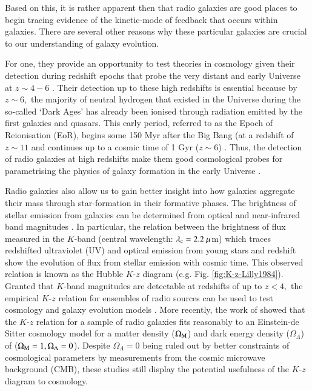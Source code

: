 Based on this, it is rather apparent then that radio galaxies are good places to begin tracing evidence of the kinetic-mode of feedback that occurs within galaxies. There are several other reasons why these particular galaxies are crucial to our understanding of galaxy evolution. 

For one, they provide an opportunity to test theories in cosmology given their detection during redshift epochs that probe the very distant and early Universe at $z\sim4-6$ \citep{LillyLongair1984,Miley1989,Lacy1994a,
Waddington1999,VanBreugel1999,Jarvis2009,Saxena2018}. Their detection up to these high redshifts is essential because by $z\sim6,$ the majority of neutral hydrogen that existed in the Universe during the so-called `Dark Ages' has already been ionised through radiation emitted by the first galaxies and quasars. This early period, referred to as the Epoch of Reionisation (EoR), begins some 150 Myr after the Big Bang (at a redshift of $z\sim11$ and continues up to a cosmic time of 1 Gyr ($z\sim6$) \citep{Zaroubi2013}. Thus, the detection of radio galaxies at high redshifts make them good cosmological probes for parametrising the physics of galaxy formation in the early Universe \citep{Fan2006,Banados2018}.  

Radio galaxies also allow us to gain better insight into how galaxies aggregate their mass through star-formation in their formative phases. The brightness of stellar emission from galaxies can be determined from optical and near-infrared band magnitudes \citep{GunnOke1975}. In particular, the relation between the brightness of flux measured in the $K$-band (central wavelength: $\lambda_{\rm c}=2.2~\mu$m) which traces redshifted ultraviolet (UV) and optical emission from young stars and redshift show the evolution of flux from stellar emission with cosmic time. This observed relation is known as the Hubble $K$-$z$ diagram (e.g. Fig. \ref{fig:K-z-Lilly1984}). Granted that $K$-band magnitudes are detectable at redshifts of up to $z<4,$ the empirical $K$-$z$ relation for ensembles of radio sources can be used to test cosmology and galaxy evolution models  \citep{LillyLongair1984,EalesRawlings1996,Eales1997}. More recently, the work of \citet{Inskip2002} showed that the $K$-$z$ relation for a sample of radio galaxies fits reasonably to an Einstein-de Sitter cosmology model for a matter density ($\Omega_{\rm M}$) and dark energy density ($\Omega_\Lambda$) of ($\Omega_{\rm M}=1, \Omega_\Lambda=0$). Despite $\Omega_\Lambda=0$ being ruled out by better constraints of cosmological parameters by \citet{Planck2016} measurements from the cosmic microwave background (CMB), these studies still display the potential usefulness of the $K$-$z$ diagram to cosmology.  

